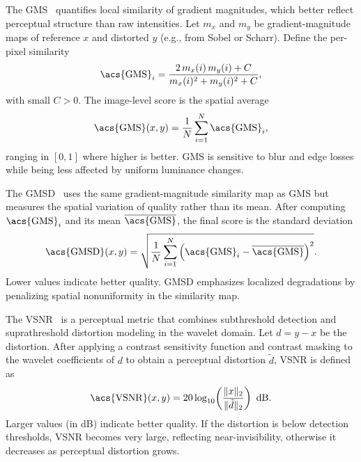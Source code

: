 The \acf{GMS}~\cite{xue2014gmsd} quantifies local similarity of gradient magnitudes, which better reflect perceptual structure than raw intensities. Let $m_x$ and $m_y$ be gradient-magnitude maps of reference $x$ and distorted $y$ (e.g., from Sobel or Scharr). Define the per-pixel similarity
\begin{equation}
\mathrm{\acs{GMS}}_i = \frac{2\,m_x(i)\,m_y(i) + C}{m_x(i)^2 + m_y(i)^2 + C},
\end{equation}
with small $C>0$. The image-level score is the spatial average
\begin{equation}
\mathrm{\acs{GMS}}(x,y) = \frac{1}{N}\sum_{i=1}^{N} \mathrm{\acs{GMS}}_i,
\end{equation}
ranging in $[0,1]$ where higher is better. \acs{GMS} is sensitive to blur and edge losses while being less affected by uniform luminance changes.

The \acf{GMSD}~\cite{xue2014gmsd} uses the same gradient-magnitude similarity map as \acs{GMS} but measures the spatial variation of quality rather than its mean. After computing $\mathrm{\acs{GMS}}_i$ and its mean $\overline{\mathrm{\acs{GMS}}}$, the final score is the standard deviation
\begin{equation}
\mathrm{\acs{GMSD}}(x,y) = \sqrt{\frac{1}{N}\sum_{i=1}^{N}\left(\mathrm{\acs{GMS}}_i - \overline{\mathrm{\acs{GMS}}}\right)^{2}}.
\end{equation}
Lower values indicate better quality. \acs{GMSD} emphasizes localized degradations by penalizing spatial nonuniformity in the similarity map.

The \acf{VSNR}~\cite{chandler2007vsnr} is a perceptual metric that combines subthreshold detection and suprathreshold distortion modeling in the wavelet domain. Let $d = y - x$ be the distortion. After applying a contrast sensitivity function and contrast masking to the wavelet coefficients of $d$ to obtain a perceptual distortion $\tilde d$, \acs{VSNR} is defined as
\begin{equation}
\mathrm{\acs{VSNR}}(x,y) = 20 \log_{10}\!\left(\frac{\lVert x \rVert_{2}}{\lVert \tilde d \rVert_{2}}\right)\ \text{dB}.
\end{equation}
Larger values (in dB) indicate better quality. If the distortion is below detection thresholds, \acs{VSNR} becomes very large, reflecting near-invisibility, otherwise it decreases as perceptual distortion grows.

